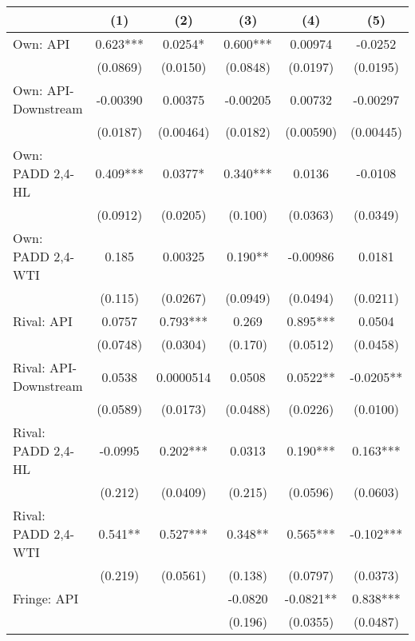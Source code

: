 {
\def\sym#1{\ifmmode^{#1}\else\(^{#1}\)\fi}
\begin{tabular}{l*{5}{c}}
\toprule
                &\multicolumn{1}{c}{(1)}   &\multicolumn{1}{c}{(2)}   &\multicolumn{1}{c}{(3)}   &\multicolumn{1}{c}{(4)}   &\multicolumn{1}{c}{(5)}   \\
\midrule
Own: API        &    0.623***&   0.0254*  &    0.600***&  0.00974   &  -0.0252   \\
                & (0.0869)   & (0.0150)   & (0.0848)   & (0.0197)   & (0.0195)   \\
\addlinespace
Own: API-Downstream& -0.00390   &  0.00375   & -0.00205   &  0.00732   & -0.00297   \\
                & (0.0187)   &(0.00464)   & (0.0182)   &(0.00590)   &(0.00445)   \\
\addlinespace
Own: PADD 2,4-HL&    0.409***&   0.0377*  &    0.340***&   0.0136   &  -0.0108   \\
                & (0.0912)   & (0.0205)   &  (0.100)   & (0.0363)   & (0.0349)   \\
\addlinespace
Own: PADD 2,4-WTI&    0.185   &  0.00325   &    0.190** & -0.00986   &   0.0181   \\
                &  (0.115)   & (0.0267)   & (0.0949)   & (0.0494)   & (0.0211)   \\
\addlinespace
Rival: API      &   0.0757   &    0.793***&    0.269   &    0.895***&   0.0504   \\
                & (0.0748)   & (0.0304)   &  (0.170)   & (0.0512)   & (0.0458)   \\
\addlinespace
Rival: API-Downstream&   0.0538   &0.0000514   &   0.0508   &   0.0522** &  -0.0205** \\
                & (0.0589)   & (0.0173)   & (0.0488)   & (0.0226)   & (0.0100)   \\
\addlinespace
Rival: PADD 2,4-HL&  -0.0995   &    0.202***&   0.0313   &    0.190***&    0.163***\\
                &  (0.212)   & (0.0409)   &  (0.215)   & (0.0596)   & (0.0603)   \\
\addlinespace
Rival: PADD 2,4-WTI&    0.541** &    0.527***&    0.348** &    0.565***&   -0.102***\\
                &  (0.219)   & (0.0561)   &  (0.138)   & (0.0797)   & (0.0373)   \\
\addlinespace
Fringe: API     &            &            &  -0.0820   &  -0.0821** &    0.838***\\
                &            &            &  (0.196)   & (0.0355)   & (0.0487)   \\

\end{tabular}}
